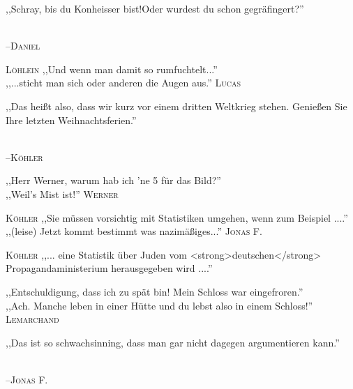 \vspace{3mm}
{\raggedright ,,Schray, bis du Konheisser bist!\/\/\/Oder wurdest du schon gegräfingert?''}\\
\raggedleft \textsc{\footnotesize --\/Daniel}\\

\vspace{3mm}
\hangindent=0.7cm
\raggedright \textsc{\footnotesize Löhlein} ,,Und wenn man damit so rumfuchtelt...''\\
\raggedleft ,,...sticht man sich oder anderen die Augen aus.'' \textsc{\footnotesize Lucas}\\

\vspace{3mm}
{\raggedright ,,Das heißt also, dass wir kurz vor einem dritten Weltkrieg stehen. Genießen Sie Ihre letzten Weihnachtsferien.''}\\
\raggedleft \textsc{\footnotesize --\/Köhler}\\

\vspace{3mm}
\hangindent=0.7cm
\raggedright \textsc{\footnotesize  } ,,Herr Werner, warum hab ich 'ne 5 für das Bild?''\\
\raggedleft ,,Weil's Mist ist!'' \textsc{\footnotesize Werner}\\

\vspace{3mm}
\hangindent=0.7cm
\raggedright \textsc{\footnotesize Köhler} ,,Sie müssen vorsichtig mit Statistiken umgehen, wenn zum Beispiel ....''\\
\raggedleft ,,(leise) Jetzt kommt bestimmt was nazimäßiges...'' \textsc{\footnotesize Jonas F.}\\
\hangindent=0.7cm
\raggedright \textsc{\footnotesize Köhler} ,,... eine Statistik über Juden vom <strong>deutschen</strong> Propagandaministerium herausgegeben wird ....''\\

\vspace{3mm}
\hangindent=0.7cm
\raggedright \textsc{\footnotesize  } ,,Entschuldigung, dass ich zu spät bin! Mein Schloss war eingefroren.''\\
\raggedleft ,,Ach. Manche leben in einer Hütte und du lebst also in einem Schloss!'' \textsc{\footnotesize Lemarchand}\\

\vspace{3mm}
{\raggedright ,,Das ist so schwachsinning, dass man gar nicht dagegen argumentieren kann.''}\\
\raggedleft \textsc{\footnotesize --\/Jonas F.}\\

